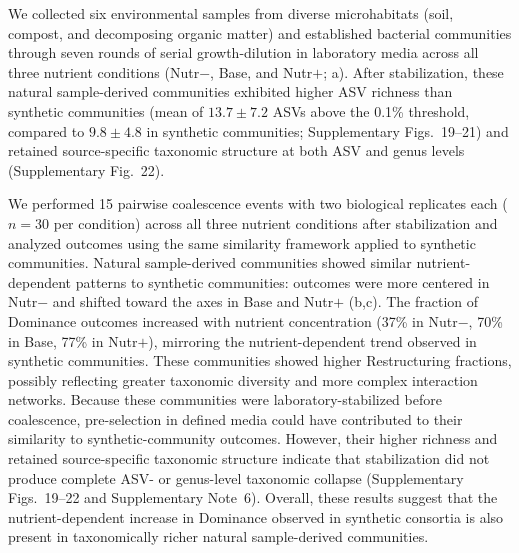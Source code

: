 We collected six environmental samples from diverse microhabitats (soil, compost, and decomposing organic matter) and established bacterial communities through seven rounds of serial growth-dilution in laboratory media across all three nutrient conditions (Nutr$-$, Base, and Nutr$+$; a). After stabilization, these natural sample-derived communities exhibited higher ASV richness than synthetic communities (mean of $13.7 \pm 7.2$ ASVs above the 0.1\% threshold, compared to $9.8 \pm 4.8$ in synthetic communities; Supplementary Figs.~19--21) and retained source-specific taxonomic structure at both ASV and genus levels (Supplementary Fig.~22).

We performed 15 pairwise coalescence events with two biological replicates each ($n = 30$ per condition) across all three nutrient conditions after stabilization and analyzed outcomes using the same similarity framework applied to synthetic communities. Natural sample-derived communities showed similar nutrient-dependent patterns to synthetic communities: outcomes were more centered in Nutr$-$ and shifted toward the axes in Base and Nutr$+$ (b,c). The fraction of Dominance outcomes increased with nutrient concentration (37\% in Nutr$-$, 70\% in Base, 77\% in Nutr$+$), mirroring the nutrient-dependent trend observed in synthetic communities. These communities showed higher Restructuring fractions, possibly reflecting greater taxonomic diversity and more complex interaction networks. Because these communities were laboratory-stabilized before coalescence, pre-selection in defined media could have contributed to their similarity to synthetic-community outcomes. However, their higher richness and retained source-specific taxonomic structure indicate that stabilization did not produce complete ASV- or genus-level taxonomic collapse (Supplementary Figs.~19--22 and Supplementary Note~6). Overall, these results suggest that the nutrient-dependent increase in Dominance observed in synthetic consortia is also present in taxonomically richer natural sample-derived communities.

